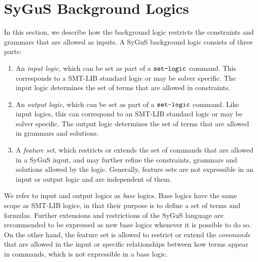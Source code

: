 \documentclass[english,a4paper,10pt]{article}
\begin{document}

\section{SyGuS Background Logics}%
\label{sec:sygus-logic}

In this section,
we describe how the background logic
restricts the constraints and grammars that are allowed as inputs.
A SyGuS background logic consists of three parts:
\begin{enumerate}
\item An \emph{input logic}, which can be set as part of a $\texttt{set-logic}$ command.
This corresponds to a SMT-LIB standard logic or may be solver specific.
The input logic determines the set of terms that are allowed in 
constraints.

\item An \emph{output logic}, which can be set as part of a $\texttt{set-logic}$ command.
Like input logics, this
can correspond to an SMT-LIB standard logic or may be solver specific.
The output logic determines the set of terms that are allowed in
grammars and solutions.

\item A \emph{feature set}, 
which restricts or extends the set of commands that are allowed in a SyGuS input,
and may further refine the constraints, grammars and solutions allowed by the logic.
Generally, feature sets are not expressible in an input or output logic
and are independent of them.
\end{enumerate}
We refer to input and output logics as \emph{base} logics.
Base logics have the same scope as SMT-LIB logics, in that their purpose is to
define a set of terms and formulas.
Further extensions and restrictions of the SyGuS language are recommended
to be expressed as new base logics whenever it is possible to do so.
On the other hand,
the feature set is allowed to restrict or extend the
\emph{commands} that are allowed in the input
or specific relationships between how terms appear in commands,
which is not expressible in a base logic.
\end{document}
